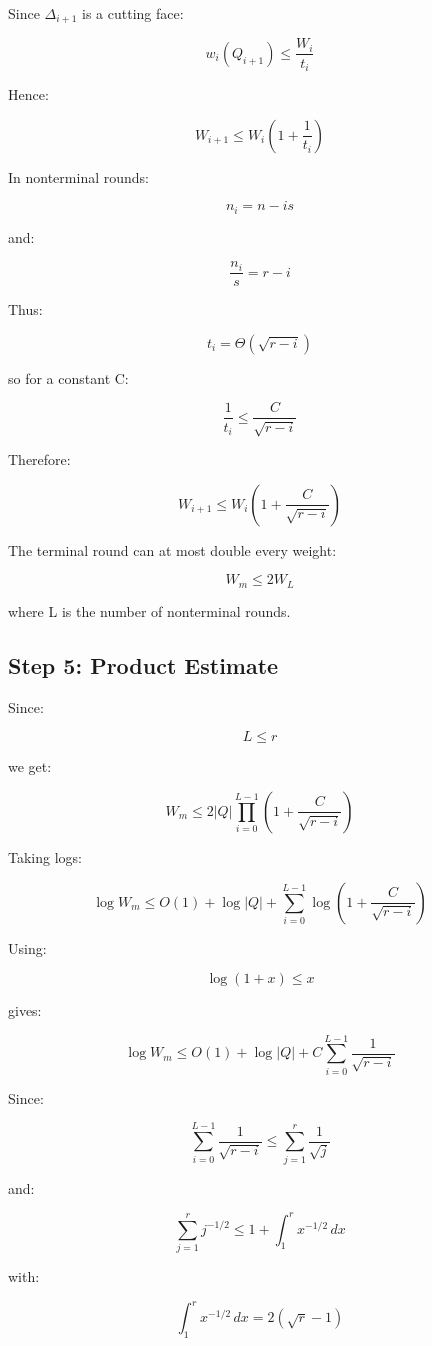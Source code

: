 \documentclass[
  11pt,
]{article}
\begin{document}
Since \(\Delta_{i+1}\) is a cutting face:

\[
w_i(Q_{i+1})\le \frac{W_i}{t_i}
\]

Hence:

\[
W_{i+1} \le W_i\left(1+\frac1{t_i}\right)
\]

In nonterminal rounds:

\[
n_i=n-is
\]

and:

\[
\frac{n_i}{s}=r-i
\]

Thus:

\[
t_i=\Theta(\sqrt{r-i})
\]

so for a constant C:

\[
\frac1{t_i}\le \frac{C}{\sqrt{r-i}}
\]

Therefore:

\[
W_{i+1} \le W_i\left(1+\frac{C}{\sqrt{r-i}}\right)
\]

The terminal round can at most double every weight:

\[
W_m\le 2W_L
\]

where L is the number of nonterminal rounds.

\hypertarget{step-5-product-estimate}{%
\subsection{Step 5: Product Estimate}\label{step-5-product-estimate}}

Since:

\[
L\le r
\]

we get:

\[
W_m \le 2|Q| \prod_{i=0}^{L-1} \left(1+\frac{C}{\sqrt{r-i}}\right)
\]

Taking logs:

\[
\log W_m \le O(1)+\log |Q| + \sum_{i=0}^{L-1} \log\left(1+\frac{C}{\sqrt{r-i}}\right)
\]

Using:

\[
\log(1+x)\le x
\]

gives:

\[
\log W_m \le O(1)+\log |Q| + C\sum_{i=0}^{L-1}\frac1{\sqrt{r-i}}
\]

Since:

\[
\sum_{i=0}^{L-1}\frac1{\sqrt{r-i}} \le \sum_{j=1}^{r}\frac1{\sqrt j}
\]

and:

\[
\sum_{j=1}^{r}j^{-1/2} \le 1+\int_1^r x^{-1/2}\,dx
\]

with:

\[
\int_1^r x^{-1/2}\,dx = 2(\sqrt r-1)
\]
\end{document}
